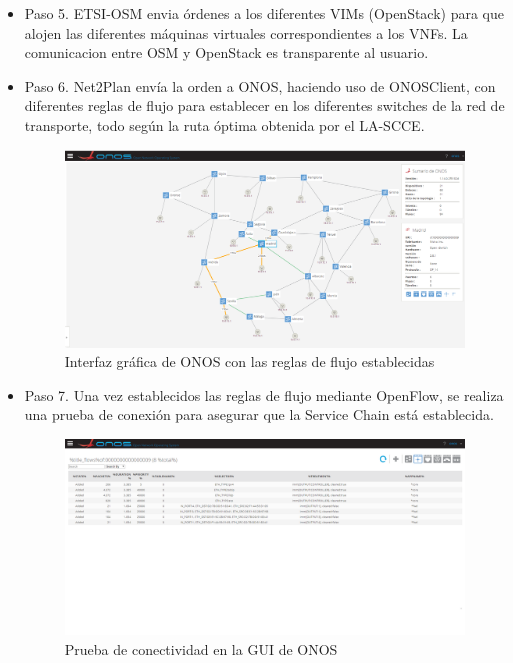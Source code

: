 \begin{itemize}
	
	\item Paso 5. ETSI-OSM envia órdenes a los diferentes VIMs (OpenStack) para que alojen las diferentes máquinas virtuales correspondientes a los VNFs. La comunicacion entre OSM y OpenStack es transparente al usuario.
	
	\item Paso 6. Net2Plan envía la orden a ONOS, haciendo uso de ONOSClient, con diferentes reglas de flujo para establecer en los diferentes switches de la red de transporte, todo según la ruta óptima obtenida por el LA-SCCE.
	
	\begin{figure}[!ht]
		\centering
		\includegraphics[width=0.9\linewidth]{imagenes/topo_onos}
		\caption{Interfaz gráfica de ONOS con las reglas de flujo establecidas}
		\label{fig:topo_onos}
	\end{figure}

	\item Paso 7. Una vez establecidos las reglas de flujo mediante OpenFlow, se realiza una prueba de conexión para asegurar que la Service Chain está establecida.
	
	\begin{figure}[!ht]
		\centering
		\includegraphics[width=0.9\linewidth]{imagenes/onos_flowrules}
		\caption{Prueba de conectividad en la GUI de ONOS}
		\label{fig:onosflowrules}
	\end{figure}


\end{itemize}


